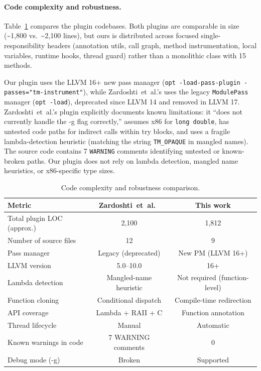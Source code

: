 \documentclass[article,12pt]{article}
\newcommand{\ZardoshtiEtAl}{Zardoshti~et~al.}
\begin{document}
\paragraph{Code complexity and robustness.}
Table~\ref{tab:complexity-comparison} compares the plugin codebases.
Both plugins are comparable in size (\textasciitilde 1,800 vs.\ \textasciitilde 2,100 lines),
but ours is distributed across focused single-responsibility headers
(annotation utils, call graph, method instrumentation, local variables,
runtime hooks, thread guard) rather than a monolithic class with 15 methods.

Our plugin uses the LLVM 16+ new pass manager (\texttt{opt -load-pass-plugin
-passes="tm-instrument"}), while \ZardoshtiEtAl's uses the legacy \texttt{ModulePass}
manager (\texttt{opt -load}), deprecated since LLVM 14 and removed in LLVM 17.
\ZardoshtiEtAl's plugin explicitly documents known limitations: it ``does not currently
handle the -g flag correctly,'' assumes x86 for \texttt{long double}, has
untested code paths for indirect calls within try blocks, and uses a fragile
lambda-detection heuristic (matching the string \texttt{TM\_OPAQUE} in mangled
names).  The source code contains 7 \texttt{WARNING} comments identifying
untested or known-broken paths.  Our plugin does not rely on lambda detection,
mangled name heuristics, or x86-specific type sizes.

\begin{table}[h]
\centering
\begin{tabular}{lcc}
\toprule
Metric & \ZardoshtiEtAl~\cite{Zardoshti2019} & This work \\
\midrule
Total plugin LOC (approx.) & 2,100 & 1,812 \\
Number of source files & 12 & 9 \\
Pass manager & Legacy (deprecated) & New PM (LLVM 16+) \\
LLVM version & 5.0--10.0 & 16+ \\
Lambda detection & Mangled-name heuristic & Not required (function-level) \\
Function cloning & Conditional dispatch & Compile-time redirection \\
API coverage & Lambda + RAII + C & Function annotation \\
Thread lifecycle & Manual & Automatic \\
Known warnings in code & 7 WARNING comments & 0 \\
Debug mode (-g) & Broken & Supported \\
\bottomrule
\end{tabular}
\caption{Code complexity and robustness comparison.}
\label{tab:complexity-comparison}
\end{table}
\end{document}
